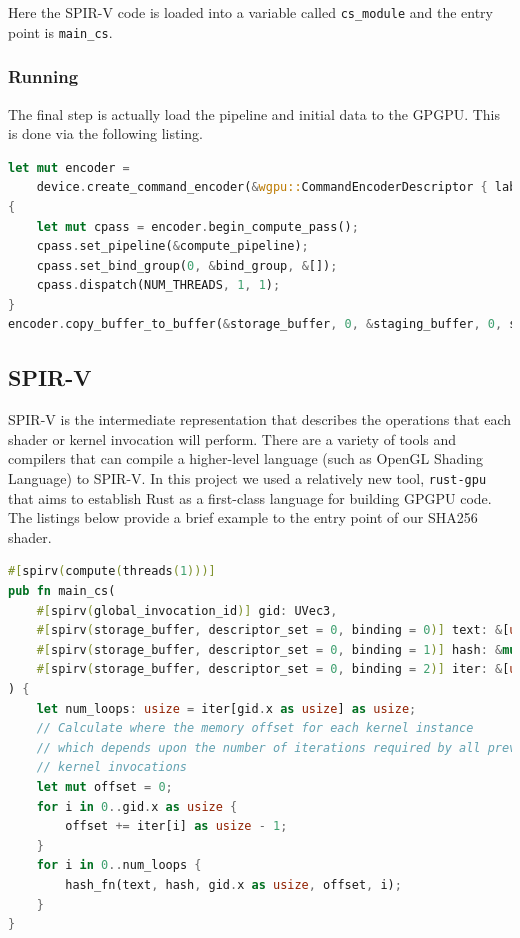 \documentclass{article}
\begin{document}
Here the SPIR-V code is loaded into a variable called \texttt{cs\_module} and the entry point is \texttt{main\_cs}.

\subsubsection{Running}

The final step is actually load the pipeline and initial data to the GPGPU. This is done via the following listing.

\begin{lstlisting}[language=Rust, style=boxed]
let mut encoder =
    device.create_command_encoder(&wgpu::CommandEncoderDescriptor { label: None });
{
    let mut cpass = encoder.begin_compute_pass();
    cpass.set_pipeline(&compute_pipeline);
    cpass.set_bind_group(0, &bind_group, &[]);
    cpass.dispatch(NUM_THREADS, 1, 1);
}
encoder.copy_buffer_to_buffer(&storage_buffer, 0, &staging_buffer, 0, size);
\end{lstlisting}

\subsection{SPIR-V}

SPIR-V is the intermediate representation that describes the operations that each shader or kernel invocation will perform. There are a variety of tools and compilers that can compile a higher-level language (such as OpenGL Shading Language) to SPIR-V. In this project we used a relatively new tool, \texttt{rust-gpu} that aims to establish Rust as a first-class language for building GPGPU code.  The listings below provide a brief example to the entry point of our SHA256 shader.

\begin{lstlisting}[language=Rust, style=boxed]
#[spirv(compute(threads(1)))]
pub fn main_cs(
    #[spirv(global_invocation_id)] gid: UVec3,
    #[spirv(storage_buffer, descriptor_set = 0, binding = 0)] text: &[u32],
    #[spirv(storage_buffer, descriptor_set = 0, binding = 1)] hash: &mut [u32],
    #[spirv(storage_buffer, descriptor_set = 0, binding = 2)] iter: &[u32],
) {
    let num_loops: usize = iter[gid.x as usize] as usize;
    // Calculate where the memory offset for each kernel instance
    // which depends upon the number of iterations required by all previous
    // kernel invocations
    let mut offset = 0;
    for i in 0..gid.x as usize {
        offset += iter[i] as usize - 1;
    }
    for i in 0..num_loops {
        hash_fn(text, hash, gid.x as usize, offset, i);
    }
}
\end{lstlisting}
\end{document}
